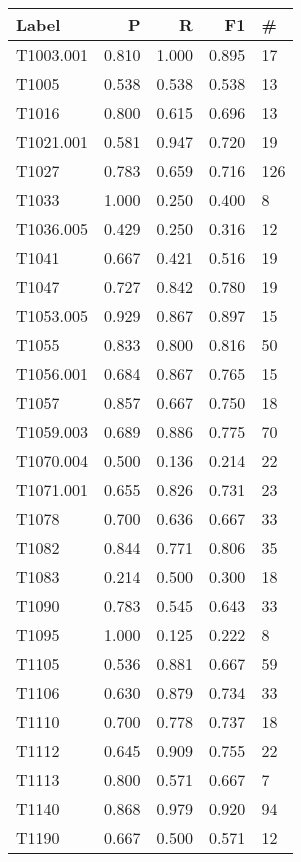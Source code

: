 \begin{tabular}{lrrrl}
    \toprule
    Label     & P     & R     & F1    & \#  \\
    \midrule
    T1003.001 & 0.810 & 1.000 & 0.895 & 17  \\
    T1005     & 0.538 & 0.538 & 0.538 & 13  \\
    T1016     & 0.800 & 0.615 & 0.696 & 13  \\
    T1021.001 & 0.581 & 0.947 & 0.720 & 19  \\
    T1027     & 0.783 & 0.659 & 0.716 & 126 \\
    T1033     & 1.000 & 0.250 & 0.400 & 8   \\
    T1036.005 & 0.429 & 0.250 & 0.316 & 12  \\
    T1041     & 0.667 & 0.421 & 0.516 & 19  \\
    T1047     & 0.727 & 0.842 & 0.780 & 19  \\
    T1053.005 & 0.929 & 0.867 & 0.897 & 15  \\
    T1055     & 0.833 & 0.800 & 0.816 & 50  \\
    T1056.001 & 0.684 & 0.867 & 0.765 & 15  \\
    T1057     & 0.857 & 0.667 & 0.750 & 18  \\
    T1059.003 & 0.689 & 0.886 & 0.775 & 70  \\
    T1070.004 & 0.500 & 0.136 & 0.214 & 22  \\
    T1071.001 & 0.655 & 0.826 & 0.731 & 23  \\
    T1078     & 0.700 & 0.636 & 0.667 & 33  \\
    T1082     & 0.844 & 0.771 & 0.806 & 35  \\
    T1083     & 0.214 & 0.500 & 0.300 & 18  \\
    T1090     & 0.783 & 0.545 & 0.643 & 33  \\
    T1095     & 1.000 & 0.125 & 0.222 & 8   \\
    T1105     & 0.536 & 0.881 & 0.667 & 59  \\
    T1106     & 0.630 & 0.879 & 0.734 & 33  \\
    T1110     & 0.700 & 0.778 & 0.737 & 18  \\
    T1112     & 0.645 & 0.909 & 0.755 & 22  \\
    T1113     & 0.800 & 0.571 & 0.667 & 7   \\
    T1140     & 0.868 & 0.979 & 0.920 & 94  \\
    T1190     & 0.667 & 0.500 & 0.571 & 12  \\

\end{tabular}
